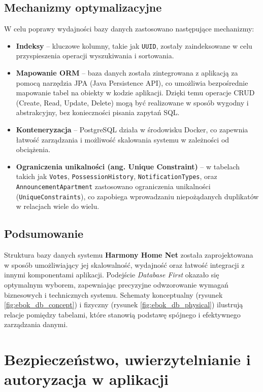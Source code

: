\subsection{Mechanizmy optymalizacyjne}

W celu poprawy wydajności bazy danych zastosowano następujące mechanizmy:
\begin{itemize}
    \item \textbf{Indeksy} -- kluczowe kolumny, takie jak \texttt{UUID}, zostały zaindeksowane w celu przyspieszenia operacji wyszukiwania i sortowania.
    \item \textbf{Mapowanie ORM} -- baza danych została zintegrowana z aplikacją za pomocą narzędzia JPA (Java Persistence API), co umożliwia bezpośrednie mapowanie tabel na obiekty w kodzie aplikacji. Dzięki temu operacje CRUD (Create, Read, Update, Delete) mogą być realizowane w sposób wygodny i abstrakcyjny, bez konieczności pisania zapytań SQL.
    \item \textbf{Konteneryzacja} -- PostgreSQL działa w środowisku Docker, co zapewnia łatwość zarządzania i możliwość skalowania systemu w zależności od obciążenia.
		\item \textbf{Ograniczenia unikalności (ang. Unique Constraint)} -- w tabelach takich jak \texttt{Votes}, \texttt{PossessionHistory}, \texttt{NotificationTypes}, oraz \texttt{AnnouncementApartment} zastosowano ograniczenia unikalności (\texttt{UniqueConstraints}), co zapobiega wprowadzaniu niepożądanych duplikatów w relacjach wiele do wielu.
\end{itemize}

\subsection{Podsumowanie}

Struktura bazy danych systemu \textbf{Harmony Home Net} została zaprojektowana w sposób umożliwiający jej skalowalność, wydajność oraz łatwość integracji z innymi komponentami aplikacji. Podejście \emph{Database First} okazało się optymalnym wyborem, zapewniając precyzyjne odwzorowanie wymagań biznesowych i technicznych systemu. Schematy konceptualny (rysunek \ref{fig:ebok_db_concept}) i fizyczny (rysunek \ref{fig:ebok_db_physical}) ilustrują relacje pomiędzy tabelami, które stanowią podstawę spójnego i efektywnego zarządzania danymi.

\section{Bezpieczeństwo, uwierzytelnianie i autoryzacja w aplikacji}


